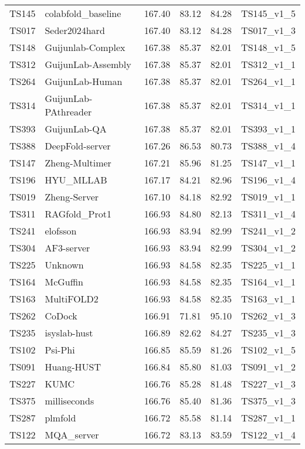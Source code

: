 \begin{longtable}{llllll}
TS145 & colabfold\_baseline & 167.40 & 83.12 & 84.28 & TS145\_v1\_5 \\ 
TS017 & Seder2024hard & 167.40 & 83.12 & 84.28 & TS017\_v1\_3 \\ 
TS148 & Guijunlab-Complex & 167.38 & 85.37 & 82.01 & TS148\_v1\_5 \\ 
TS312 & GuijunLab-Assembly & 167.38 & 85.37 & 82.01 & TS312\_v1\_1 \\ 
TS264 & GuijunLab-Human & 167.38 & 85.37 & 82.01 & TS264\_v1\_1 \\ 
TS314 & GuijunLab-PAthreader & 167.38 & 85.37 & 82.01 & TS314\_v1\_1 \\ 
TS393 & GuijunLab-QA & 167.38 & 85.37 & 82.01 & TS393\_v1\_1 \\ 
TS388 & DeepFold-server & 167.26 & 86.53 & 80.73 & TS388\_v1\_4 \\ 
TS147 & Zheng-Multimer & 167.21 & 85.96 & 81.25 & TS147\_v1\_1 \\ 
TS196 & HYU\_MLLAB & 167.17 & 84.21 & 82.96 & TS196\_v1\_4 \\ 
TS019 & Zheng-Server & 167.10 & 84.18 & 82.92 & TS019\_v1\_1 \\ 
TS311 & RAGfold\_Prot1 & 166.93 & 84.80 & 82.13 & TS311\_v1\_4 \\ 
TS241 & elofsson & 166.93 & 83.94 & 82.99 & TS241\_v1\_2 \\ 
TS304 & AF3-server & 166.93 & 83.94 & 82.99 & TS304\_v1\_2 \\ 
TS225 & Unknown & 166.93 & 84.58 & 82.35 & TS225\_v1\_1 \\ 
TS164 & McGuffin & 166.93 & 84.58 & 82.35 & TS164\_v1\_1 \\ 
TS163 & MultiFOLD2 & 166.93 & 84.58 & 82.35 & TS163\_v1\_1 \\ 
TS262 & CoDock & 166.91 & 71.81 & 95.10 & TS262\_v1\_3 \\ 
TS235 & isyslab-hust & 166.89 & 82.62 & 84.27 & TS235\_v1\_3 \\ 
TS102 & Psi-Phi & 166.85 & 85.59 & 81.26 & TS102\_v1\_5 \\ 
TS091 & Huang-HUST & 166.84 & 85.80 & 81.03 & TS091\_v1\_2 \\ 
TS227 & KUMC & 166.76 & 85.28 & 81.48 & TS227\_v1\_3 \\ 
TS375 & milliseconds & 166.76 & 85.40 & 81.36 & TS375\_v1\_3 \\ 
TS287 & plmfold & 166.72 & 85.58 & 81.14 & TS287\_v1\_1 \\ 
TS122 & MQA\_server & 166.72 & 83.13 & 83.59 & TS122\_v1\_4 \\ 

\end{longtable}
